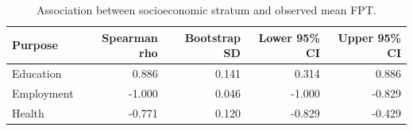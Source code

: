 \begin{table}
\caption{Association between socioeconomic stratum and observed mean FPT.}
\label{tab:s8_stratum}
\begin{tabular}{lrrrr}
\toprule
Purpose & Spearman rho & Bootstrap SD & Lower 95\% CI & Upper 95\% CI \\
\midrule
Education & 0.886 & 0.141 & 0.314 & 0.886 \\
Employment & -1.000 & 0.046 & -1.000 & -0.829 \\
Health & -0.771 & 0.120 & -0.829 & -0.429 \\
\bottomrule
\end{tabular}
\end{table}

